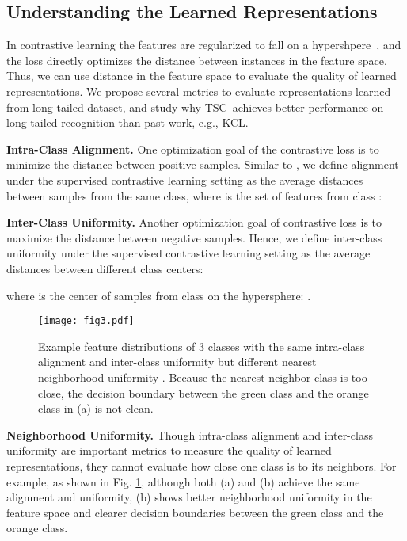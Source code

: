 \documentclass[10pt,twocolumn,letterpaper]{article}
\newcommand{\name} {TSC}
\begin{document}
\subsection{Understanding the Learned Representations}
\label{subsec:metrics}
In contrastive learning the features are regularized to fall on a hypershpere~\cite{chen2020simple,he2020momentum}, and the loss directly optimizes the distance between instances in the feature space. Thus, we can use distance in the feature space to evaluate the quality of learned representations. We propose several metrics to evaluate representations learned from long-tailed dataset, and study why \name~achieves better performance on long-tailed recognition than past work, e.g., KCL.

\textbf{Intra-Class Alignment.} One optimization goal of the contrastive loss is to minimize the distance between positive samples. Similar to \cite{wang2020understanding}, we define alignment under the supervised contrastive learning setting as the average distances between samples from the same class, where  is the set of features from class :


\textbf{Inter-Class Uniformity.} Another optimization goal of contrastive loss is to maximize the distance between negative samples. Hence, we define inter-class uniformity under the supervised contrastive learning setting as the average distances between different class centers:

where  is the center of samples from class  on the hypersphere: .

\begin{figure}[t]
\begin{center}
\texttt{[image: fig3.pdf]}
\end{center}
\vspace{-5pt}
\caption{\small
Example feature distributions of 3 classes with the same intra-class alignment and inter-class uniformity but different nearest neighborhood uniformity . Because the nearest neighbor class is too close, the decision boundary between the green class and the orange class in (a) is not clean.}
\label{fig:balance}
\vspace{-10pt}
\end{figure}

\textbf{Neighborhood Uniformity.} Though intra-class alignment and inter-class  uniformity are important metrics to measure the quality of learned representations, they cannot evaluate how close one class is to its neighbors. For example, as shown in Fig. \ref{fig:balance}, although both (a) and (b) achieve the same alignment and uniformity, (b) shows better neighborhood uniformity in the feature space and clearer decision boundaries between the green class and the orange class. 
\end{document}
